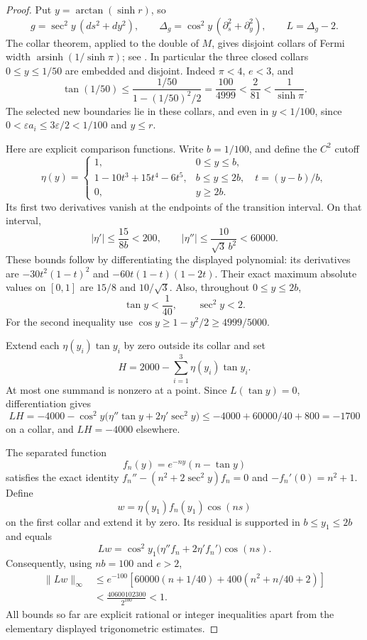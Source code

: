 \begin{proof}
Put $y=\arctan(\sinh r)$, so
\[
 g=\sec^2y\,(ds^2+dy^2),\qquad
 \Delta_g=\cos^2y\,(\partial_s^2+\partial_y^2),\qquad
 L=\Delta_g-2.
\]
The collar theorem, applied to the double of $M$, gives disjoint collars of Fermi width $\operatorname{arsinh}(1/\sinh\pi)$; see \cite[Theorem~2.18, pp.~22--23]{McMullen1994A567}. In particular the three closed collars $0\le y\le1/50$ are embedded and disjoint. Indeed $\pi<4$, $e<3$, and
\[
 \tan(1/50)\le\frac{1/50}{1-(1/50)^2/2}
 =\frac{100}{4999}<\frac2{81}<\frac1{\sinh\pi}.
\]
The selected new boundaries lie in these collars, and even in $y<1/100$, since $0<\varepsilon a_i\le3\varepsilon/2<1/100$ and $y\le r$.

Here are explicit comparison functions. Write $b=1/100$, and define the $C^2$ cutoff
\[
 \eta(y)=\begin{cases}
 1,&0\le y\le b,\\
 1-10t^3+15t^4-6t^5,&b\le y\le2b,\quad t=(y-b)/b,\\
 0,&y\ge2b.
 \end{cases}
\]
Its first two derivatives vanish at the endpoints of the transition interval. On that interval,
\[
 |\eta'|\le\frac{15}{8b}<200,\qquad
 |\eta''|\le\frac{10}{\sqrt3\,b^2}<60000.
\]
These bounds follow by differentiating the displayed polynomial: its derivatives are $-30t^2(1-t)^2$ and $-60t(1-t)(1-2t)$. Their exact maximum absolute values on $[0,1]$ are $15/8$ and $10/\sqrt3$. Also, throughout $0\le y\le2b$,
\[
 \tan y<\frac1{40},\qquad \sec^2y<2.
\]
For the second inequality use $\cos y\ge1-y^2/2\ge4999/5000$.

Extend each $\eta(y_i)\tan y_i$ by zero outside its collar and set
\[
 H=2000-\sum_{i=1}^3\eta(y_i)\tan y_i.
\]
At most one summand is nonzero at a point. Since $L(\tan y)=0$, differentiation gives
\[
 LH=-4000-\cos^2y\bigl(\eta''\tan y+2\eta'\sec^2y\bigr)
 \le-4000+60000/40+800=-1700
\]
on a collar, and $LH=-4000$ elsewhere.

The separated function
\[
 f_n(y)=e^{-ny}(n-\tan y)
\]
satisfies the exact identity $f_n''-(n^2+2\sec^2y)f_n=0$ and $-f_n'(0)=n^2+1$. Define
\[
 w=\eta(y_1)f_n(y_1)\cos(ns)
\]
on the first collar and extend it by zero. Its residual is supported in $b\le y_1\le2b$ and equals
\[
 Lw=\cos^2y_1\bigl(\eta''f_n+2\eta'f_n'\bigr)\cos(ns).
\]
Consequently, using $nb=100$ and $e>2$,
\begin{align*}
 \|Lw\|_\infty
 &\le e^{-100}\left[60000(n+1/40)
       +400(n^2+n/40+2)\right]\\
 &<\frac{40600102300}{2^{100}}<1.
\end{align*}
All bounds so far are explicit rational or integer inequalities apart from the elementary displayed trigonometric estimates.


\end{proof}
